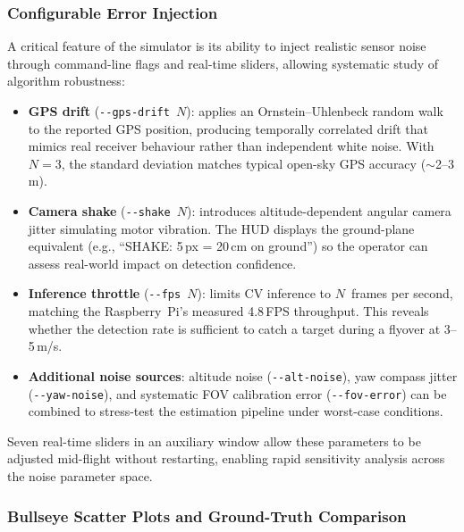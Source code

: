 \subsubsection{Configurable Error Injection}

A critical feature of the simulator is its ability to inject realistic sensor noise through command-line flags and real-time sliders, allowing systematic study of algorithm robustness:

\begin{itemize}
    \item \textbf{GPS drift} (\texttt{-{}-gps-drift $N$}): applies an Ornstein--Uhlenbeck random walk to the reported GPS position, producing temporally correlated drift that mimics real receiver behaviour rather than independent white noise. With $N = 3$, the standard deviation matches typical open-sky GPS accuracy ($\sim$2--3\,m).

    \item \textbf{Camera shake} (\texttt{-{}-shake $N$}): introduces altitude-dependent angular camera jitter simulating motor vibration. The HUD displays the ground-plane equivalent (e.g., ``SHAKE: 5\,px = 20\,cm on ground'') so the operator can assess real-world impact on detection confidence.

    \item \textbf{Inference throttle} (\texttt{-{}-fps $N$}): limits CV inference to $N$~frames per second, matching the Raspberry~Pi's measured 4.8\,FPS throughput. This reveals whether the detection rate is sufficient to catch a target during a flyover at 3--5\,m/s.

    \item \textbf{Additional noise sources}: altitude noise (\texttt{-{}-alt-noise}), yaw compass jitter (\texttt{-{}-yaw-noise}), and systematic FOV calibration error (\texttt{-{}-fov-error}) can be combined to stress-test the estimation pipeline under worst-case conditions.
\end{itemize}

Seven real-time sliders in an auxiliary window allow these parameters to be adjusted mid-flight without restarting, enabling rapid sensitivity analysis across the noise parameter space.

\subsubsection{Bullseye Scatter Plots and Ground-Truth Comparison}

